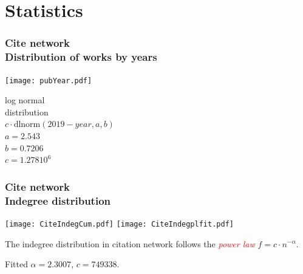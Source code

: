 \documentclass[hyperref={pdfstartview={FitBH -32768},
                         pdfpagemode=FullScreen,
                         plainpages=false,
                         colorlinks=true}
              ]{beamer}
\newcommand{\keyw}[1]{\textcolor{red}{\emph{#1}}}
\begin{document}
\section{Statistics}


\begin{frame}[fragile]
\frametitle{Cite network\label{maxinc}\\ \normalsize Distribution of works by years}
\begin{center}
\parbox{72mm}{\texttt{[image: pubYear.pdf]}}
\parbox{28mm}{\footnotesize log normal \\ distribution\\[3pt]
\tiny
$c\cdot \mbox{dlnorm}(2019-year,a,b)$\\[3pt]
\footnotesize
$a = 2.543$\\
$b = 0.7206$\\
$c = 1.278 10^6$}
\end{center}
\end{frame}


\begin{frame}[fragile]
\frametitle{Cite network\label{maxind}\\ \normalsize Indegree distribution}

\texttt{[image: CiteIndegCum.pdf]}
\texttt{[image: CiteIndegplfit.pdf]}

\small
The indegree distribution in citation network follows the \keyw{power law} $f = c \cdot n^{-\alpha}$.

Fitted $\alpha = 2.3007$, $c=749338$.
\end{frame}
\end{document}

